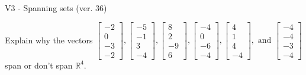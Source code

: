 \begin{exercise}
  \begin{exerciseTitle}V3 - Spanning sets (ver. 36)\end{exerciseTitle}
  \begin{exerciseStatement}
    Explain why the vectors \(\left[\begin{array}{r}
-2 \\
0 \\
-3 \\
-2
\end{array}\right] , \left[\begin{array}{r}
-5 \\
-1 \\
3 \\
-4
\end{array}\right] , \left[\begin{array}{r}
8 \\
2 \\
-9 \\
6
\end{array}\right] , \left[\begin{array}{r}
-4 \\
0 \\
-6 \\
-4
\end{array}\right] , \left[\begin{array}{r}
4 \\
1 \\
4 \\
-4
\end{array}\right] , \text{ and } \left[\begin{array}{r}
-4 \\
-4 \\
-3 \\
-4
\end{array}\right]\) span or don't span \(\mathbb{R}^4\). 
	



\end{exerciseStatement}
\end{exercise}

